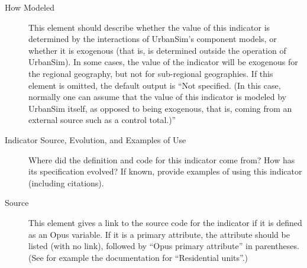 \begin{description}
\item[How Modeled]
This element should describe whether the value of this indicator is
determined by the interactions of UrbanSim's component models, or whether
it is exogenous (that is, is determined outside the operation of UrbanSim).
In some cases, the value of the indicator will be exogenous for the
regional geography, but not for sub-regional geographies.  If this element
is omitted, the default output is ``Not specified.  (In this case,
normally one can assume that the value of this indicator is modeled by
UrbanSim itself, as opposed to being exogenous, that is, coming from an
external source such as a control total.)''

\item[Indicator Source, Evolution, and Examples of Use]
Where did the definition and code for this indicator come from?  How
has its specification evolved?  If known, provide examples of using this
indicator (including citations).

\item[Source] This element gives a link to the source code for the
indicator if it is defined as an Opus variable.  If it is a primary
attribute, the attribute should be listed (with no link), followed by
``Opus primary attribute'' in parentheses.  (See for example the
documentation for ``Residential units''.)

\end{description}
